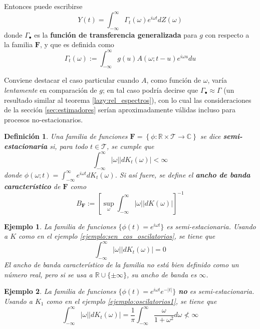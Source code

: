 \documentclass[12pt,letterpaper]{book}
\newtheorem{definicion}{Definición}[chapter]
\newtheorem{ejemplo}{Ejemplo}[chapter]
\newcommand{\R}{\mathbb{R}}
\newcommand{\C}{\mathbb{C}}
\newcommand{\intR}{\int_{-\infty}^{\infty}}
\newcommand{\ef}{\mathbf{F}}
\newcommand{\abso}[1]{\left| #1 \right|}
\begin{document}
Entonces puede escribirse 
\begin{equation}
Y(t) = \intR \Gamma_t(\omega) e^{i \omega t} dZ(\omega) 
\label{se6:filtrado}
\end{equation}
donde $\Gamma_\bullet$ es la \textbf{función de transferencia generalizada} para $g$ con respecto a la familia $\ef$, y que es definida como
\begin{equation}
\Gamma_t (\omega) := \intR g(u) A(\omega; t-u) e^{i \omega u} du
\label{se6:trans_general}
\end{equation}

Conviene destacar el caso particular cuando $A$, como función de $\omega$, varía \textit{lentamente} en comparación de $g$; en tal caso podría decirse que $\Gamma_\bullet \approx \Gamma$ (un resultado similar al teorema \ref{lazy:rel_espectros}), con lo cual las consideraciones de la sección \ref{sec:estimadores} serían aproximadamente válidas incluso para procesos no-estacionarios.

\begin{definicion}
Una familia de funciones $\ef = \left\{ \phi: \R \times \mathcal{T} \rightarrow \C \right\}$ se dice \textbf{semi-estacionaria} si, para todo $t \in \mathcal{T}$, se cumple que
\begin{equation}
\intR \abso{\omega} \abso{dK_t(\omega)} < \infty
\end{equation}
donde $\phi(\omega; t) = \intR e^{i \omega t} dK_t(\omega)$. Si así fuere, se define el \textbf{ancho de banda característico} de $\ef$ como
\begin{equation}
B_\ef := \left[ \sup_\omega \intR \abso{\omega} \abso{dK(\omega)} \right]^{-1}
\end{equation}
\end{definicion}

\begin{ejemplo}
La familia de funciones $\{ \phi(t) = e^{i \omega t} \}$ es semi-estacionaria. Usando a $K$ como en el ejemplo \ref{ejemplo:sen_cos_oscilatorios}, se tiene que
\begin{equation}
\intR \abso{\omega} \abso{dK_t(\omega)} = 0
\end{equation}
El ancho de banda característico de la familia no está bien definido como un número real, pero si se usa a $\R\cup \{ \pm \infty \}$, su ancho de banda es $\infty$.
\label{lazy12}
\end{ejemplo}

\begin{ejemplo}
La familia de funciones $\{ \phi(t) = e^{i \omega t} e^{-\abso{t}} \}$ \textbf{no} es semi-estacionaria. Usando a $K_1$ como en el ejemplo \ref{ejemplo:oscilatorios1}, se tiene que
\begin{equation}
\intR \abso{\omega} \abso{dK_t(\omega)} = \frac{1}{\pi} \intR \frac{\omega}{1 + \omega^2} d\omega \nless \infty
\end{equation}
\end{ejemplo}
\end{document}
